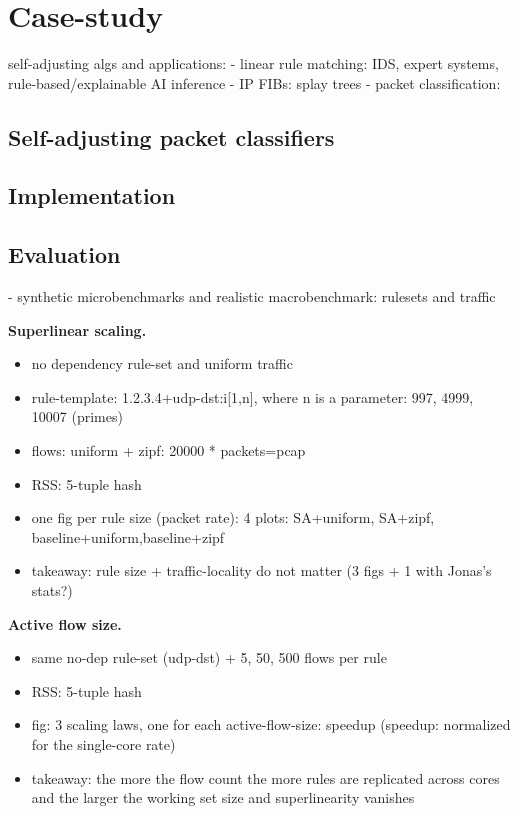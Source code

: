 \section{Case-study }\label{sec:case-study}

self-adjusting algs and applications:
- linear rule matching: IDS, expert systems, rule-based/explainable AI inference
- IP FIBs: splay trees
- packet classification:


\subsection{Self-adjusting packet classifiers}
\label{sec:sa-nf-tables}

\subsection{Implementation}
\label{sec:sa-nf-tables-impl}

\subsection{Evaluation}
\label{sec:sa-nf-tables-eval}

- synthetic microbenchmarks and realistic macrobenchmark: rulesets and traffic

\noindent%
\textbf{Superlinear scaling.} %
\begin{itemize}
\item no dependency rule-set and uniform traffic
\item rule-template: 1.2.3.4+udp-dst:i[1,n], where n is a parameter: 997, 4999, 10007 (primes)
\item flows: uniform + zipf: 20000 * packets=pcap
\item RSS: 5-tuple hash
\item one fig per rule size (packet rate): 4 plots: SA+uniform, SA+zipf, baseline+uniform,baseline+zipf
\item takeaway: rule size + traffic-locality do not matter (3 figs + 1 with Jonas's stats?)
\end{itemize}

\noindent%
\textbf{Active flow size.} %
\begin{itemize}
\item same no-dep rule-set (udp-dst) + 5, 50, 500 flows per rule
\item RSS: 5-tuple hash
\item fig: 3 scaling laws, one for each active-flow-size: speedup (speedup: normalized for the single-core rate)
\item takeaway: the more the flow count the more rules are replicated across cores and the larger the working set size and superlinearity vanishes
\end{itemize}

